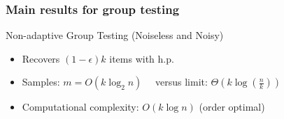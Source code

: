 %
%

\begin{frame} \frametitle{Main results for group testing}

\begin{block}{Non-adaptive Group Testing (Noiseless and Noisy)}
\begin{itemize}
\item Recovers $(1-\epsilon)k$ items with h.p.
\item Samples: $m = O(k \log_2 n)$ \ \ versus limit: $\Theta(k \log( \frac{n}{k} ))$
\item Computational complexity: $O(k \log n)$  (order optimal)
\end{itemize}
\end{block}

\end{frame}
